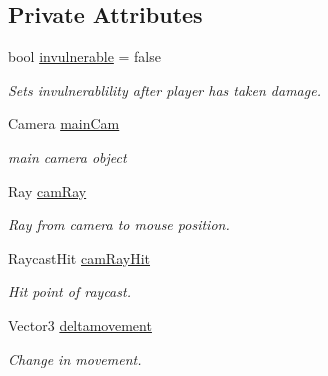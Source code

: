 \subsection*{Private Attributes}
\begin{DoxyCompactItemize}
\item 
\mbox{\label{class_player_aab2a1e98356973545e45c3071190b8e5}} 
bool \hyperlink{class_player_aab2a1e98356973545e45c3071190b8e5}{invulnerable} = false
\begin{DoxyCompactList}\small\item\em Sets invulnerablility after player has taken damage. \end{DoxyCompactList}\item 
\mbox{\label{class_player_a36830e22f302a4e03aa615efbc472881}} 
Camera \hyperlink{class_player_a36830e22f302a4e03aa615efbc472881}{main\+Cam}
\begin{DoxyCompactList}\small\item\em main camera object \end{DoxyCompactList}\item 
\mbox{\label{class_player_a5dfe4ae1b620a31044be3d8987a8661e}} 
Ray \hyperlink{class_player_a5dfe4ae1b620a31044be3d8987a8661e}{cam\+Ray}
\begin{DoxyCompactList}\small\item\em Ray from camera to mouse position. \end{DoxyCompactList}\item 
\mbox{\label{class_player_a896f013d0fa8988d8508aac39ecf676d}} 
Raycast\+Hit \hyperlink{class_player_a896f013d0fa8988d8508aac39ecf676d}{cam\+Ray\+Hit}
\begin{DoxyCompactList}\small\item\em Hit point of raycast. \end{DoxyCompactList}\item 
\mbox{\label{class_player_a2954d91cf05871fed826b707e65604c5}} 
Vector3 \hyperlink{class_player_a2954d91cf05871fed826b707e65604c5}{deltamovement}
\begin{DoxyCompactList}\small\item\em Change in movement. \end{DoxyCompactList}\item 

\end{DoxyCompactItemize}

